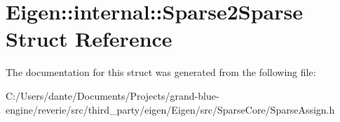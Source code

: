 \hypertarget{struct_eigen_1_1internal_1_1_sparse2_sparse}{}\section{Eigen\+::internal\+::Sparse2\+Sparse Struct Reference}
\label{struct_eigen_1_1internal_1_1_sparse2_sparse}


The documentation for this struct was generated from the following file\+:\begin{DoxyCompactItemize}
\item 
C\+:/\+Users/dante/\+Documents/\+Projects/grand-\/blue-\/engine/reverie/src/third\+\_\+party/eigen/\+Eigen/src/\+Sparse\+Core/Sparse\+Assign.\+h\end{DoxyCompactItemize}
